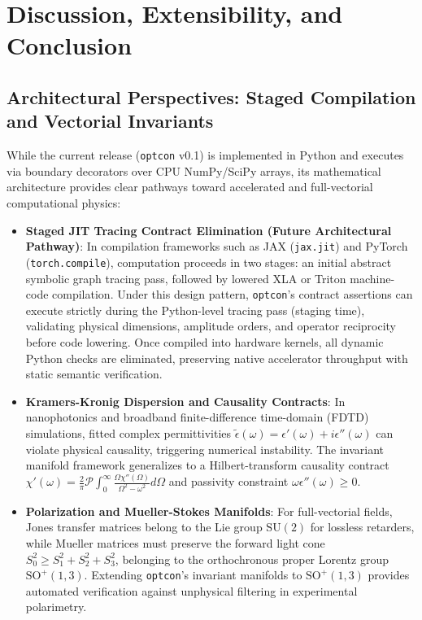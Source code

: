 \documentclass[preprint,12pt]{elsarticle}
\begin{document}
\section{Discussion, Extensibility, and Conclusion}
\label{sec:conclusion}

\subsection{Architectural Perspectives: Staged Compilation and Vectorial Invariants}

While the current release (\texttt{optcon} v0.1) is implemented in Python and executes via boundary decorators over CPU NumPy/SciPy arrays, its mathematical architecture provides clear pathways toward accelerated and full-vectorial computational physics:
\begin{itemize}
    \item \textbf{Staged JIT Tracing Contract Elimination (Future Architectural Pathway)}: In compilation frameworks such as JAX (\texttt{jax.jit}) and PyTorch (\texttt{torch.compile}), computation proceeds in two stages: an initial abstract symbolic graph tracing pass, followed by lowered XLA or Triton machine-code compilation. Under this design pattern, \texttt{optcon}'s contract assertions can execute strictly during the Python-level tracing pass (staging time), validating physical dimensions, amplitude orders, and operator reciprocity before code lowering. Once compiled into hardware kernels, all dynamic Python checks are eliminated, preserving native accelerator throughput with static semantic verification.
    \item \textbf{Kramers-Kronig Dispersion and Causality Contracts}: In nanophotonics and broadband finite-difference time-domain (FDTD) simulations, fitted complex permittivities $\tilde{\epsilon}(\omega) = \epsilon'(\omega) + i \epsilon''(\omega)$ can violate physical causality, triggering numerical instability. The invariant manifold framework generalizes to a Hilbert-transform causality contract $\chi'(\omega) = \frac{2}{\pi} \mathcal{P} \int_0^\infty \frac{\Omega \chi''(\Omega)}{\Omega^2 - \omega^2} d\Omega$ and passivity constraint $\omega \epsilon''(\omega) \ge 0$.
    \item \textbf{Polarization and Mueller-Stokes Manifolds}: For full-vectorial fields, Jones transfer matrices belong to the Lie group $\mathrm{SU}(2)$ for lossless retarders, while Mueller matrices must preserve the forward light cone $S_0^2 \ge S_1^2 + S_2^2 + S_3^2$, belonging to the orthochronous proper Lorentz group $\mathrm{SO}^+(1, 3)$. Extending \texttt{optcon}'s invariant manifolds to $\mathrm{SO}^+(1, 3)$ provides automated verification against unphysical filtering in experimental polarimetry.
\end{itemize}
\end{document}
